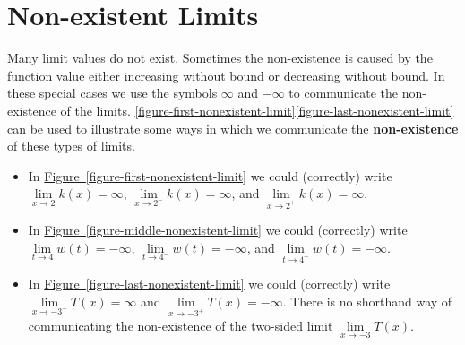 \documentclass[12pt,]{book}
\newcommand{\terminology}[1]{\textbf{#1}}
\theoremstyle{plain}
\theoremstyle{definition}
\theoremstyle{definition}
\theoremstyle{definition}
\theoremstyle{definition}
\theoremstyle{definition}
\numberwithin{equation}{section}
\newcommand{\fe}[2]{#1\mathopen{}\left(#2\right)\mathclose{}}
\begin{document}
\section[{Non-existent Limits}]{Non-existent Limits}\label{section-nonexistent-limits}
Many limit values do not exist. Sometimes the non-existence is caused by the function value either increasing without bound or decreasing without bound. In these special cases we use the symbols \(\infty\) and \(-\infty\) to communicate the non-existence of the limits. \hyperref[figure-first-nonexistent-limit]{\ref{figure-first-nonexistent-limit}}\textendash{}\hyperref[figure-last-nonexistent-limit]{\ref{figure-last-nonexistent-limit}} can be used to illustrate some ways in which we communicate the \terminology{non-existence} of these types of limits.%
\leavevmode%
\begin{itemize}[label=\textbullet]
\item{}In \hyperref[figure-first-nonexistent-limit]{Figure~\ref{figure-first-nonexistent-limit}} we could (correctly) write\(\lim\limits_{x\to2}\fe{k}{x}=\infty\), \(\lim\limits_{x\to2^{-}}\fe{k}{x}=\infty\), and \(\lim\limits_{x\to2^{+}}\fe{k}{x}=\infty\).%
\item{}In \hyperref[figure-middle-nonexistent-limit]{Figure~\ref{figure-middle-nonexistent-limit}} we could (correctly) write\(\lim\limits_{t\to4}\fe{w}{t}=-\infty\), \(\lim\limits_{t\to4^{-}}\fe{w}{t}=-\infty\), and \(\lim\limits_{t\to4^{+}}\fe{w}{t}=-\infty\).%
\item{}In \hyperref[figure-last-nonexistent-limit]{Figure~\ref{figure-last-nonexistent-limit}} we could (correctly) write\(\lim\limits_{x\to-3^{-}}\fe{T}{x}=\infty\) and \(\lim\limits_{x\to-3^{+}}\fe{T}{x}=-\infty\). There is no shorthand way of communicating the non-existence of the two-sided limit \(\lim\limits_{x\to-3}\fe{T}{x}\).%
\end{itemize}
\end{document}
